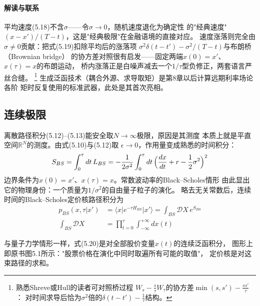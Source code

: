 \paragraph{解读与联系}
平均速度(5.18)不含$\sigma$——令$\sigma\to0$，随机速度退化为确定性
的"经典速度"$(x-x')/(T-t)$，这是"经典极限"在金融语境的直接对应。
速度涨落则完全由$\sigma\neq0$贡献：把式(5.19)扣除平均后的涨落项
$\sigma^{2}\delta(t-t')-\sigma^{2}/(T-t)$与布朗桥（Brownian bridge）
的协方差对照很有启发——固定两端$x(0)=x'$、$x(\tau)=x$的布朗运动，
桥内涨落正是白噪声减去一个$1/\tau$型负修正，两套语言严丝合缝。
\footnote{熟悉Shreve或Hull的读者可对照桥过程
$W_{s}-\frac{s}{\tau}W_{\tau}$的协方差$\min(s,s')-\frac{ss'}{\tau}$：
对时间求导后恰为$\sigma^{2}$倍的$\delta(t-t')-\frac{1}{\tau}$结构。}
生成泛函技术（耦合外源、求导取矩）是第8章以后计算远期利率场论各阶
矩时反复使用的标准武器，此处是其首次亮相。

\subsection*{连续极限}

离散路径积分(5.12)--(5.13)能安全取$N\to\infty$极限，原因是其测度
本质上就是平直空间$\mathbb{R}^{N}$的测度。由式(5.10)与(5.12)取
$\epsilon\to0$，作用量变成熟悉的时间积分：
\begin{equation*}
S_{BS}=\int_{0}^{\tau}dt\,L_{BS}
=-\frac{1}{2\sigma^{2}}\int_{0}^{\tau}dt\,
\Bigl(\frac{dx}{dt}+r-\frac{1}{2}\sigma^{2}\Bigr)^{2}
\end{equation*}
边界条件为$x(0)=x'$、$x(\tau)=x$。常数波动率的Black--Scholes情形
由此显出它的物理身份：一个质量为$1/\sigma^{2}$的自由量子粒子的演化。
略去无关常数后，连续时间的Black--Scholes定价核路径积分为
\begin{align*}
p_{BS}(x,\tau\vert x')&=\langle x\vert e^{-\tau H_{BS}}\vert x'\rangle
=\int_{BS}\mathcal{D}X\,e^{S_{BS}}\\
\int_{BS}\mathcal{D}X&=\prod_{t=0}^{\tau}\int_{-\infty}^{+\infty}dx(t)
\tag{5.20}
\end{align*}


与量子力学情形一样，式(5.20)是对全部股价变量$x(t)$的连续泛函积分，
图形上即原书图5.1所示："股票价格在演化中同时取遍所有可能的取值"，
定价核是对这束路径的求和。

